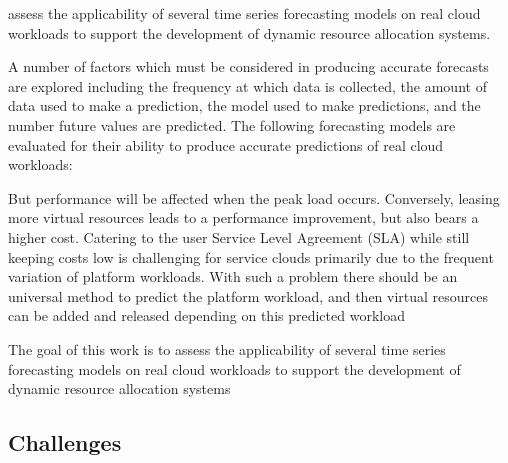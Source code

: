 assess the applicability of several time series forecasting models on real cloud workloads to support the development of dynamic resource allocation systems. 

A number of factors which must be considered in producing accurate forecasts are explored including the frequency
at which data is collected, the amount of data used to make a prediction, the model used to make predictions, and the number future values are predicted. The following forecasting models are evaluated for their ability to produce accurate predictions of real cloud workloads:


But performance will be affected when the peak load occurs. Conversely, leasing more virtual resources leads to a performance improvement, but also bears a higher cost. Catering to the user Service Level Agreement (SLA) while still keeping costs low is challenging for service clouds primarily due to the frequent variation of
platform workloads. With such a problem there should be an universal method to predict the platform workload, and then virtual resources can be added and released depending on this predicted workload



The goal of this work is to assess the applicability of several time series forecasting models on real cloud workloads to support the development of dynamic resource allocation systems
\usepackage{multirow}

\subsection{Challenges}
